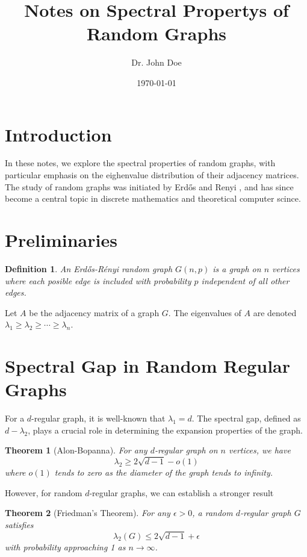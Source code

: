 \documentclass[12pt,a4paper]{article}
\title{Notes on Spectral Propertys of Random Graphs}
\author{Dr. John Doe}
\date{\today}
\newtheorem{theorem}{Theorem}
\newtheorem{definition}{Definition}
\begin{document}
\maketitle

\section{Introduction}
In these notes, we explore the spectral properties of random graphs, with particular emphasis on the eighenvalue distribution of their adjacency matrices. The study of random graphs was initiated by Erdős and Renyi \cite{erdos1960evolution}, and has since become a central topic in discrete mathematics and theoretical computer scince.

\section{Preliminaries}
\begin{definition}
An Erdős-Rényi random graph $G(n,p)$ is a graph on $n$ vertices where each posible edge is included with probability $p$ independent of all other edges.
\end{definition}

Let $A$ be the adjacency matrix of a graph $G$. The eigenvalues of $A$ are denoted $\lambda_1 \geq \lambda_2 \geq \cdots \geq \lambda_n$.

\section{Spectral Gap in Random Regular Graphs}
For a $d$-regular graph, it is well-known that $\lambda_1 = d$. The spectral gap, defined as $d - \lambda_2$, plays a crucial role in determining the expansion properties of the graph.

\begin{theorem}[Alon-Bopanna]
For any $d$-regular graph on $n$ vertices, we have
\begin{equation}
\lambda_2 \geq 2\sqrt{d-1} - o(1)
\end{equation}
where $o(1)$ tends to zero as the diameter of the graph tends to infinity.
\end{theorem}

However, for random $d$-regular graphs, we can establish a stronger result

\begin{theorem}[Friedman's Theorem]
For any $\epsilon > 0$, a random $d$-regular graph $G$ satisfies
\begin{equation}
\lambda_2(G) \leq 2\sqrt{d-1} + \epsilon
\end{equation}
with probability approaching 1 as $n \to \infty$.
\end{theorem}
\end{document}
